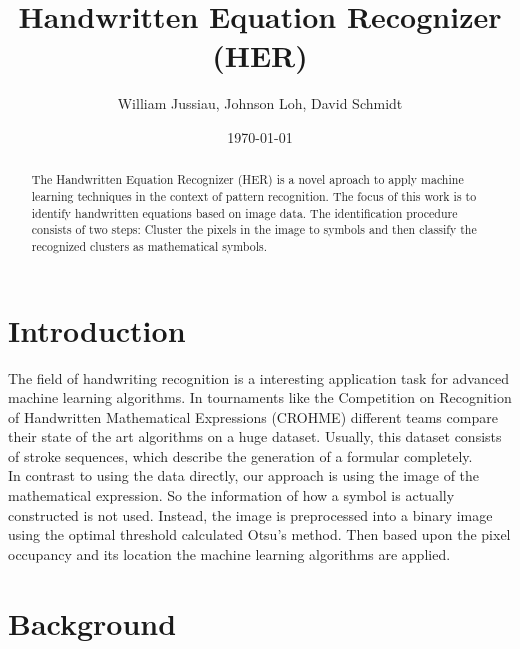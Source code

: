 \documentclass[twocolumn]{article}%
\title{Handwritten Equation Recognizer (HER)}
\author{William Jussiau, Johnson Loh, David Schmidt}
\date{\today}
\begin{document}
\begin{strip}
  \vspace*{\dimexpr-\baselineskip-\stripsep\relax}
  \centering
  \maketitle
  \vskip\baselineskip
  \vskip\baselineskip
\end{strip}


    \begin{abstract}
	    The Handwritten Equation Recognizer (HER) is a novel aproach to apply machine learning techniques in the context of pattern recognition. The focus of this work is to identify handwritten equations based on image data. The identification procedure consists of two steps: Cluster the pixels in the image to symbols and then classify the recognized clusters as mathematical symbols.
	\end{abstract}
	
	\section{Introduction}
		The field of handwriting recognition is a interesting application task for advanced machine learning algorithms. In tournaments like the Competition on Recognition of Handwritten Mathematical Expressions (CROHME) \cite{crohme} different teams compare their state of the art algorithms on a huge dataset. Usually, this dataset consists of stroke sequences, which describe the generation of a formular completely.\\
		In contrast to using the data directly, our approach is using the image of the mathematical expression. So the information of how a symbol is actually constructed is not used. Instead, the image is preprocessed into a binary image using the optimal threshold calculated Otsu's method. Then based upon the pixel occupancy and its location the machine learning algorithms are applied.
	    
	\section{Background}
	    
	    
\end{document}

